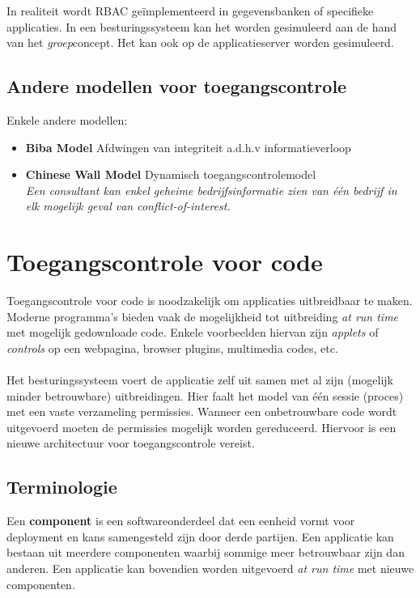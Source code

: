 \documentclass[../main.tex]{subfiles}
\begin{document}
In realiteit wordt RBAC ge\"implementeerd in gegevensbanken of specifieke applicaties. In een besturingssysteem kan het worden gesimuleerd aan de hand van het \textit{groep}concept. Het kan ook op de applicatieserver worden gesimuleerd.


\subsection{Andere modellen voor toegangscontrole}
Enkele andere modellen:
\begin{itemize}
	\item \textbf{Biba Model} Afdwingen van integriteit a.d.h.v informatieverloop
	\item \textbf{Chinese Wall Model} Dynamisch toegangscontrolemodel \\ 
	\textit{Een consultant kan enkel geheime bedrijfsinformatie zien van \'e\'en bedrijf in elk mogelijk geval van conflict-of-interest. }
\end{itemize}

\section{Toegangscontrole voor code}
Toegangscontrole voor code is noodzakelijk om applicaties uitbreidbaar te maken. Moderne programma's bieden vaak de mogelijkheid tot uitbreiding \textit{at run time} met mogelijk gedownloade code.  Enkele voorbeelden hiervan zijn \textit{applets} of \textit{controls} op een webpagina, browser plugins, multimedia codes, etc. 
\\\\
Het besturingssysteem voert de applicatie zelf uit samen met al zijn (mogelijk minder betrouwbare) uitbreidingen. Hier faalt het model van \'e\'en sessie (proces) met een vaste verzameling permissies. Wanneer een onbetrouwbare code wordt uitgevoerd moeten de permissies mogelijk worden gereduceerd. Hiervoor is een nieuwe architectuur voor toegangscontrole vereist.

\subsection{Terminologie}


Een \textbf{component} is een softwareonderdeel dat een eenheid vormt voor deployment en kans samengesteld zijn door derde partijen. Een applicatie kan bestaan uit meerdere componenten waarbij sommige meer betrouwbaar zijn dan anderen. Een applicatie kan bovendien worden uitgevoerd \textit{at run time} met nieuwe componenten. 
\end{document}
